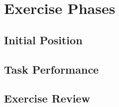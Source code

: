 \section{Exercise Phases}

\subsection{Initial Position}
\subsection{Task Performance}
\subsection{Exercise Review}







